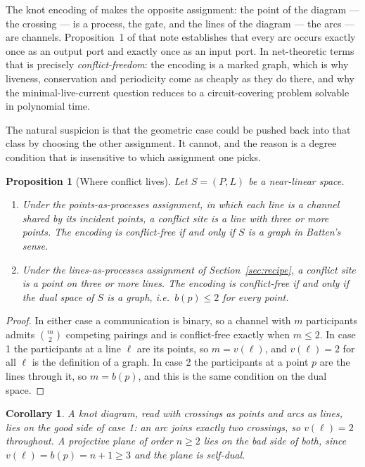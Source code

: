 \documentclass[11pt]{article}
\theoremstyle{plain}
\newtheorem{proposition}[theorem]{Proposition}
\newtheorem{corollary}[theorem]{Corollary}
\theoremstyle{definition}
\theoremstyle{remark}
\begin{document}
The knot encoding of \cite{KnotsNote} makes the opposite assignment: the point of the
diagram --- the crossing --- is a process, the gate, and the lines of the diagram --- the
arcs --- are channels. Proposition~1 of that note establishes that every arc occurs
exactly once as an output port and exactly once as an input port. In net-theoretic terms
that is precisely \emph{conflict-freedom}: the encoding is a marked graph, which is why
liveness, conservation and periodicity come as cheaply as they do there, and why the
minimal-live-current question reduces to a circuit-covering problem solvable in
polynomial time.

The natural suspicion is that the geometric case could be pushed back into that class by
choosing the other assignment. It cannot, and the reason is a degree condition that is
insensitive to which assignment one picks.

\begin{proposition}[Where conflict lives]
\label{prop:conflict}
Let $S = (P,L)$ be a near-linear space.
\begin{enumerate}
\item Under the \emph{points-as-processes} assignment, in which each line is a channel
shared by its incident points, a conflict site is a line with three or more points. The
encoding is conflict-free if and only if $S$ is a graph in Batten's sense.
\item Under the \emph{lines-as-processes} assignment of Section~\ref{sec:recipe}, a
conflict site is a point on three or more lines. The encoding is conflict-free if and
only if the dual space of $S$ is a graph, i.e.\ $b(p) \leq 2$ for every point.
\end{enumerate}
\end{proposition}

\begin{proof}
In either case a communication is binary, so a channel with $m$ participants admits
$\binom{m}{2}$ competing pairings and is conflict-free exactly when $m \leq 2$. In case 1
the participants at a line $\ell$ are its points, so $m = v(\ell)$, and $v(\ell) = 2$ for
all $\ell$ is the definition of a graph. In case 2 the participants at a point $p$ are the
lines through it, so $m = b(p)$, and this is the same condition on the dual space.
\end{proof}

\begin{corollary}
A knot diagram, read with crossings as points and arcs as lines, lies on the good side of
case \textup{1}: an arc joins exactly two crossings, so $v(\ell) = 2$ throughout. A
projective plane of order $n \geq 2$ lies on the bad side of both, since $v(\ell) = b(p) =
n+1 \geq 3$ and the plane is self-dual.
\end{corollary}
\end{document}
